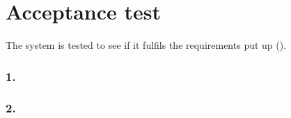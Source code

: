 \chapter{Acceptance test} \label{chap:acceptanceTest}
The system is tested to see if it fulfils the requirements put up ().

\subsection{1. }

\subsection{2. }